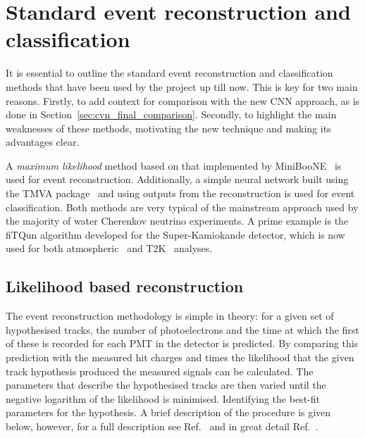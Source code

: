 \section{Standard event reconstruction and classification} %
\label{sec:cvn_old} %

It is essential to outline the standard event reconstruction and classification methods that have
been used by the \chips project up till now. This is key for two main reasons. Firstly, to add
context for comparison with the new CNN approach, as is done in
Section~\ref{sec:cvn_final_comparison}. Secondly, to highlight the main weaknesses of these
methods, motivating the new technique and making its advantages clear.

A \emph{maximum likelihood} method based on that implemented by MiniBooNE~\cite{patterson2009} is
used for event reconstruction. Additionally, a simple neural network built using the TMVA
package~\cite{hocker2007} and using outputs from the reconstruction is used for event
classification. Both methods are very typical of the mainstream approach used by the majority of
water Cherenkov neutrino experiments. A prime example is the fiTQun algorithm developed for the
Super-Kamiokande detector, which is now used for both atmospheric~\cite{jiang2019} and
T2K~\cite{missert2017} analyses.

\subsection{Likelihood based reconstruction} %
\label{sec:cvn_old_reco} %

The event reconstruction methodology is simple in theory: for a given set of hypothesised tracks,
the number of photoelectrons and the time at which the first of these is recorded for each PMT in
the detector is predicted. By comparing this prediction with the measured hit charges and times
the likelihood that the given track hypothesis produced the measured signals can be calculated.
The parameters that describe the hypothesised tracks are then varied until the negative logarithm
of the likelihood is minimised. Identifying the best-fit parameters for the hypothesis. A brief
description of the procedure is given below, however, for a full description see
Ref.~\cite{blake2016} and in great detail Ref.~\cite{perch2017}.

